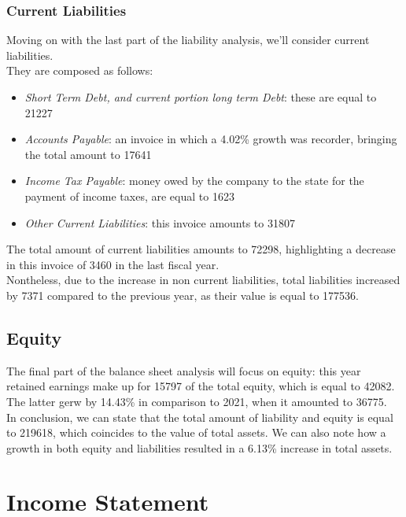 \documentclass{article}
\begin{document}
\subsubsection{Current Liabilities}
Moving on with the last part of the liability analysis, we'll consider current liabilities.\\
They are composed as follows:
\begin{itemize}
  \item \textit{Short Term Debt, and current portion long term Debt}: these are equal to 21227
  \item \textit{Accounts Payable}: an invoice in which a 4.02\% growth was recorder, bringing the total amount to 17641
  \item \textit{Income Tax Payable}: money owed by the company to the state for the payment of income taxes, are equal to 1623
  \item \textit{Other Current Liabilities}: this invoice amounts to 31807 
\end{itemize}
The total amount of current liabilities amounts to 72298, highlighting a decrease in this invoice of 3460 in the last fiscal year.\\
Nontheless, due to the increase in non current liabilities, total liabilities increased by 7371 compared to the previous year, as their value is equal to 177536.
\subsection{Equity}
The final part of the balance sheet analysis will focus on equity: this year retained earnings make up for 15797 of the total equity, which is equal to 42082. The latter gerw by 14.43\% in comparison to 2021, when it amounted to 36775.\\
In conclusion, we can state that the total amount of liability and equity is equal to 219618, which coincides to the value of total assets. We can also note how a growth in both equity and liabilities resulted in a 6.13\% increase in total assets.
\section{Income Statement} 
\end{document}
